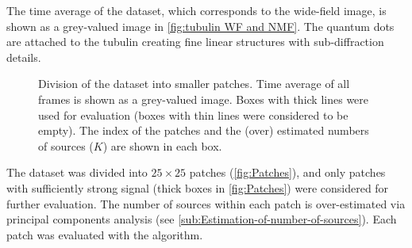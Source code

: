 The time average of the dataset, which corresponds to the wide-field image, is shown as a grey-valued image in \autoref{fig:tubulin WF and NMF}\aaa. The quantum dots are attached to the tubulin creating fine linear structures with sub-diffraction details. 

\begin{figure}[!htb]
	\centering
	\caption{Division of the dataset into smaller patches. Time average of all frames is shown as a grey-valued image. Boxes with thick lines were used for \inmf{} evaluation (boxes with thin lines were considered to be empty). The index of the patches and the (over) estimated numbers of sources ($K$) are shown in each box.}
	\label{fig:Patches}
\end{figure}
%
The dataset was divided into $25 \times 25$ patches (\autoref{fig:Patches}), and only patches with sufficiently strong signal (thick boxes in \autoref{fig:Patches}) were considered for further evaluation. The number of sources within each patch is over-estimated via principal components analysis (see \autoref{sub:Estimation-of-number-of-sources}). Each patch was evaluated with the \inmf{} algorithm.

